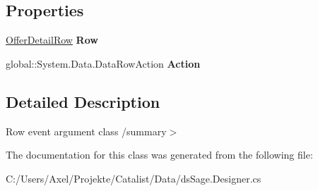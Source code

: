 \subsection*{Properties}
\begin{DoxyCompactItemize}
\item 
\hyperlink{class_products_1_1_data_1_1ds_sage_1_1_offer_detail_row}{Offer\+Detail\+Row} {\bfseries Row}\hypertarget{class_products_1_1_data_1_1ds_sage_1_1_offer_detail_row_change_event_a2e2d1dcd0e460691796c595f13435583}{}\label{class_products_1_1_data_1_1ds_sage_1_1_offer_detail_row_change_event_a2e2d1dcd0e460691796c595f13435583}

\item 
global\+::\+System.\+Data.\+Data\+Row\+Action {\bfseries Action}\hypertarget{class_products_1_1_data_1_1ds_sage_1_1_offer_detail_row_change_event_a8b06fa52740a70956758b02715953905}{}\label{class_products_1_1_data_1_1ds_sage_1_1_offer_detail_row_change_event_a8b06fa52740a70956758b02715953905}

\end{DoxyCompactItemize}


\subsection{Detailed Description}
Row event argument class /summary$>$ 

The documentation for this class was generated from the following file\+:\begin{DoxyCompactItemize}
\item 
C\+:/\+Users/\+Axel/\+Projekte/\+Catalist/\+Data/ds\+Sage.\+Designer.\+cs\end{DoxyCompactItemize}

